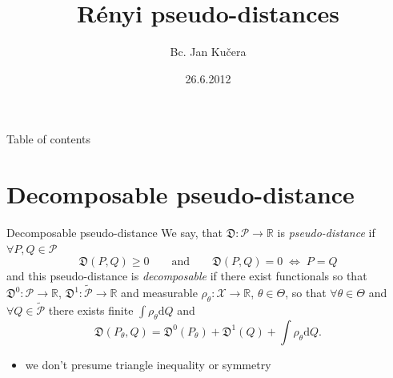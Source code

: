 \documentclass[11pt,a4paper]{beamer}
\author{Bc. Jan Kučera}
\title{Rényi pseudo-distances}
\institute{FNSPE, CTU \\ $\quad$  \\ Work supervisor: Ing. Václav Kůs Ph.D.}
\date{26.6.2012}
\begin{document}
\begin{frame}
	\maketitle
\end{frame}

\begin{frame}{Table of contents}
    	\tableofcontents
\end{frame}

%

\section{Decomposable pseudo-distance} %
\begin{frame}{Decomposable pseudo-distance}
		We say, that $\mathfrak{D}:\mathcal{P} \rightarrow \mathbb{R}$ is \emph{pseudo-distance} if $\forall P,Q\in\mathcal{P}$
		\begin{equation*}
			\mathfrak{D}(P,Q) \geq 0  \qquad \text{and} \qquad \mathfrak{D}(P,Q)=0 \; \Leftrightarrow \; P=Q
		\end{equation*}
		 and this pseudo-distance is \emph{ decomposable} if there exist functionals so that
		 $\mathfrak{D}^0:\mathcal{P}\rightarrow\mathbb{R}$, $ \mathfrak{D}^1:\mathcal{\tilde{P}} \rightarrow \mathbb{R}$ and measurable  
		  $\rho_\theta : \mathcal{X} \rightarrow \mathbb{R}$, $ \theta \in \Theta$, so that $\forall \theta \in \Theta$ and $\forall Q \in \mathcal{\tilde{P}}$ there exists finite $\int{\rho_\theta }\mathrm{d}Q$ and
		\begin{equation*}
			\mathfrak{D} (P_\theta, Q) = \mathfrak{D}^0 (P_\theta) + \mathfrak{D}^1 (Q) + \int \rho_\theta \mathrm{d}Q.
		\end{equation*}
		\begin{itemize}
			\item we don't presume triangle inequality or symmetry
		\end{itemize}			
\end{frame}
\end{document}

